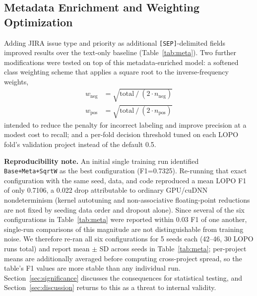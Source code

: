 \documentclass[preprint,12pt]{elsarticle}
\begin{document}
\subsection{Metadata Enrichment and Weighting Optimization}
\label{sec:metadata}

Adding JIRA issue type and priority as additional \texttt{[SEP]}-delimited fields improved results over the text-only baseline (Table~\ref{tab:meta}). Two further modifications were tested on top of this metadata-enriched model: a softened class weighting scheme that applies a square root to the inverse-frequency weights,
\begin{subequations}\label{eq:weights}
\begin{align}
w_{\text{neg}} &= \sqrt{\text{total} \mathbin{/} (2 \cdot n_{\text{neg}}) \label{eq:wneg}} \\
w_{\text{pos}} &= \sqrt{\text{total} \mathbin{/} (2 \cdot n_{\text{pos}}) \label{eq:wpos}}
\end{align}
\end{subequations}
intended to reduce the penalty for incorrect labeling and improve precision at a modest cost to recall; and a per-fold decision threshold tuned on each LOPO fold's validation project instead of the default 0.5.

\textbf{Reproducibility note.} An initial single training run identified \texttt{Base+Meta+SqrtW} as the best configuration (F1=0.7325). Re-running that exact configuration with the same seed, data, and code reproduced a mean LOPO F1 of only 0.7106, a 0.022 drop attributable to ordinary GPU/cuDNN nondeterminism (kernel autotuning and non-associative floating-point reductions are not fixed by seeding data order and dropout alone). Since several of the six configurations in Table~\ref{tab:meta} were reported within 0.03 F1 of one another, single-run comparisons of this magnitude are not distinguishable from training noise. We therefore re-ran all six configurations for 5 seeds each (42--46, 30 LOPO runs total) and report mean $\pm$ SD across seeds in Table~\ref{tab:meta}; per-project means are additionally averaged before computing cross-project spread, so the table's F1 values are more stable than any individual run. Section~\ref{sec:significance} discusses the consequences for statistical testing, and Section~\ref{sec:discussion} returns to this as a threat to internal validity.
\end{document}
